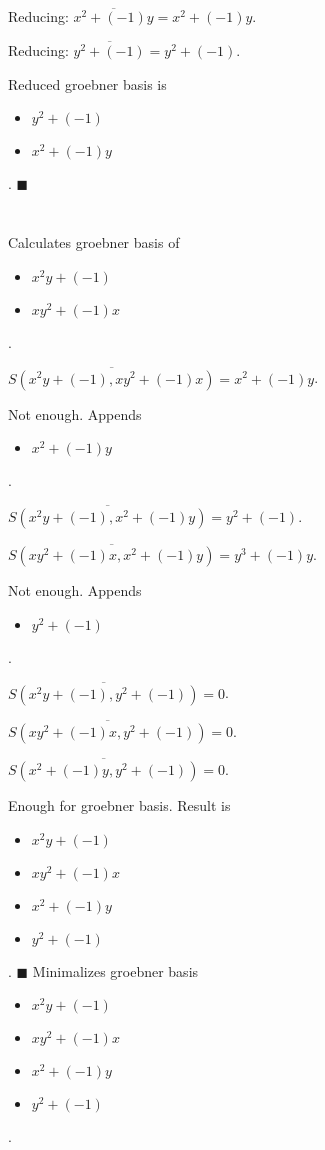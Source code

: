\documentclass{jsarticle}
\begin{document}
Reducing: $\overline{x^{2}+(-1)y} = x^{2}+(-1)y$.  

Reducing: $\overline{y^{2}+(-1)} = y^{2}+(-1)$.  

Reduced groebner basis is 
\begin{itemize}
\item $y^{2}+(-1)$
\item $x^{2}+(-1)y$
\end{itemize}  . 
$\blacksquare{}$

\section{}Calculates groebner basis of 
\begin{itemize}
\item $x^{2}y+(-1)$
\item $xy^{2}+(-1)x$
\end{itemize}  . 


$\overline{S(x^{2}y+(-1), xy^{2}+(-1)x)} = x^{2}+(-1)y$.  

Not enough.  Appends \begin{itemize}
\item $x^{2}+(-1)y$
\end{itemize}  . 


$\overline{S(x^{2}y+(-1), x^{2}+(-1)y)} = y^{2}+(-1)$.  

$\overline{S(xy^{2}+(-1)x, x^{2}+(-1)y)} = y^{3}+(-1)y$.  

Not enough.  Appends \begin{itemize}
\item $y^{2}+(-1)$
\end{itemize}  . 


$\overline{S(x^{2}y+(-1), y^{2}+(-1))} = 0$.  

$\overline{S(xy^{2}+(-1)x, y^{2}+(-1))} = 0$.  

$\overline{S(x^{2}+(-1)y, y^{2}+(-1))} = 0$.  

Enough for groebner basis.  Result is \begin{itemize}
\item $x^{2}y+(-1)$
\item $xy^{2}+(-1)x$
\item $x^{2}+(-1)y$
\item $y^{2}+(-1)$
\end{itemize}  . 
$\blacksquare{}$
Minimalizes groebner basis 
\begin{itemize}
\item $x^{2}y+(-1)$
\item $xy^{2}+(-1)x$
\item $x^{2}+(-1)y$
\item $y^{2}+(-1)$
\end{itemize}  . 
\end{document}
